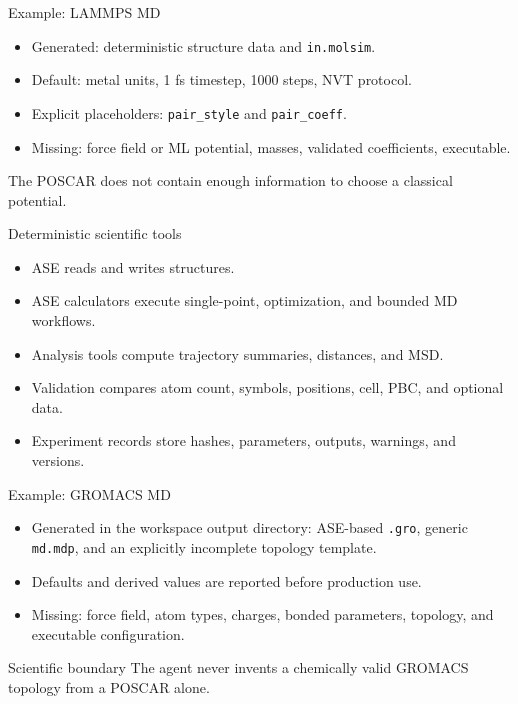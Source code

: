 \documentclass[aspectratio=169,11pt]{beamer}
\begin{document}
\begin{frame}{Example: LAMMPS MD}
\begin{itemize}
  \item Generated: deterministic structure data and \texttt{in.molsim}.
  \item Default: metal units, 1 fs timestep, 1000 steps, NVT protocol.
  \item Explicit placeholders: \texttt{pair\_style} and \texttt{pair\_coeff}.
  \item Missing: force field or ML potential, masses, validated coefficients, executable.
\end{itemize}
The POSCAR does not contain enough information to choose a classical potential.
\end{frame}

\begin{frame}{Deterministic scientific tools}
\begin{itemize}
  \item ASE reads and writes structures.
  \item ASE calculators execute single-point, optimization, and bounded MD workflows.
  \item Analysis tools compute trajectory summaries, distances, and MSD.
  \item Validation compares atom count, symbols, positions, cell, PBC, and optional data.
  \item Experiment records store hashes, parameters, outputs, warnings, and versions.
\end{itemize}
\end{frame}

\begin{frame}{Example: GROMACS MD}
\begin{itemize}
  \item Generated in the workspace output directory: ASE-based \texttt{.gro}, generic
  \texttt{md.mdp}, and an explicitly incomplete topology template.
  \item Defaults and derived values are reported before production use.
  \item Missing: force field, atom types, charges, bonded parameters, topology, and
  executable configuration.
\end{itemize}
\begin{alertblock}{Scientific boundary}
The agent never invents a chemically valid GROMACS topology from a POSCAR alone.
\end{alertblock}
\end{frame}
\end{document}
